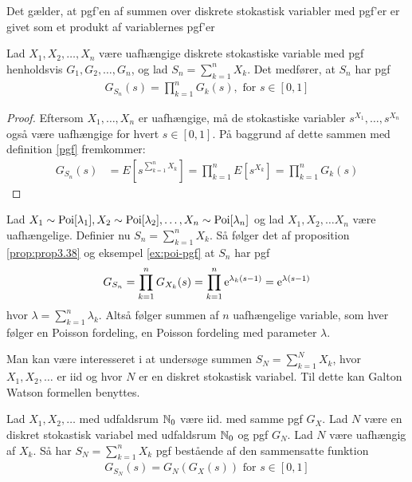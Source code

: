 Det gælder, at pgf'en af summen over diskrete stokastisk variabler med pgf'er er givet som et produkt af variablernes pgf'er
\begin{prop} \label{prop:prop3.38}%
    Lad $X_1, X_2, \ldots, X_n$ være uafhængige diskrete stokastiske variable med pgf henholdsvis $G_1, G_2, \ldots, G_n$, og lad $S_n= \sum^n_{k = 1} X_k$. Det medfører, at $S_n$ har pgf
    \begin{align*}
        G_{S_n}(s)=\prod^n_{k = 1} G_k(s), \text{ for } s \in [0, 1]
    \end{align*}
\end{prop}

\begin{proof}
Eftersom $X_1, \ldots, X_n$ er uafhængige, må de stokastiske variabler $s^{X_1}, \ldots, s^{X_n} $ også være uafhængige for hvert $s\in[0,1]$. På baggrund af dette sammen med definition \ref{pgf} fremkommer:
\begin{align*}
    G_{S_n}(s) &= E[s^{\sum^n_{k = 1} X_k}] = \prod^n_{k = 1} E[s^{X_k}] = \prod^n_{k = 1} G_k(s) 
\end{align*}
\end{proof}
\begin{exmp}\label{exmp:sumAfPoissonFordeling}
Lad $X_1 \sim \textnormal{Poi}[\lambda_1], X_2 \sim \textnormal{Poi}[\lambda_2], \ldots, X_n \sim \textnormal{Poi}[\lambda_n]$ og lad $X_1, X_2, \ldots X_n$ være uafhængelige. Definier nu $S_n = \sum^n_{k = 1} X_k$. Så følger det af proposition \ref{prop:prop3.38} og eksempel \ref{ex:poi-pgf} at $S_n$ har pgf
\begin{equation*}
    G_{S_n} = \prod^n_{k = 1} G_{X_k}(s) = \prod^n_{k = 1} \mathrm{e}^{\lambda_k(s - 1)} = \mathrm{e}^{\lambda(s - 1)}
\end{equation*}
hvor $\lambda = \sum^n_{k = 1} \lambda_k$. Altså følger summen af $n$ uafhængelige variable, som hver følger en Poisson fordeling, en Poisson fordeling med parameter $\lambda$.
\end{exmp}
Man kan være interesseret i at undersøge summen $S_N = \sum^N_{k = 1} X_k$, hvor $X_1, X_2, \ldots$ er iid og hvor $N$ er en diskret stokastisk variabel. Til dette kan Galton Watson formellen benyttes.
\begin{prop}  \label{prop 3.39} %
  Lad $X_1,X_2,\ldots$ med udfaldsrum $\mathbb{N}_0$ være iid. med samme pgf $G_X$. Lad $N$ være en diskret stokastisk variabel med udfaldsrum $\mathbb{N}_0$ og pgf $G_N$. Lad $N$ være uafhængig af $X_k$. Så har $S_N= \sum_{k=1}^n X_k$ pgf bestående af den sammensatte funktion
    \begin{align*}
        G_{S_N}(s)=G_N(G_X(s)) \text{ for } s \in [0, 1]
    \end{align*}
\end{prop}
